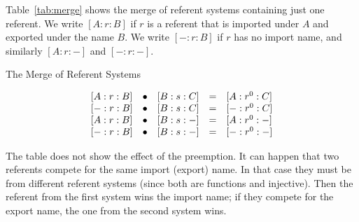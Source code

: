 Table~\ref{tab:merge} shows the merge of referent systems containing
just one referent. We write $[A : r : B]$ if $r$ is a referent that
is imported under $A$ and exported under the name $B$. We write
$[- : r : B]$ if $r$ has no import name, and similarly $[A : r : -]$
and $[- : r : -]$.
\begin{table}
\caption{The Merge of Referent Systems}
\label{tab:merge}
\begin{center}
$$\begin{array}{l@{\quad \bullet \quad}l@{\quad = \quad}l}
\rfs{A : r : B} & \rfs{B : s : C} & \rfs{A : r^0 : C} \\
\rfs{- : r : B} & \rfs{B : s : C} & \rfs{- : r^0 : C} \\
\rfs{A : r : B} & \rfs{B : s : -} & \rfs{A : r^0 : -} \\
\rfs{- : r : B} & \rfs{B : s : -} & \rfs{- : r^0 : -}
\end{array}$$
\end{center}
\end{table}
The table does not show the effect of the preemption. It can
happen that two referents compete for the same import (export)
name. In that case they must be from different referent systems
(since both are functions and injective). Then the referent
from the first system wins the import name; if they compete
for the export name, the one from the second system wins. 

